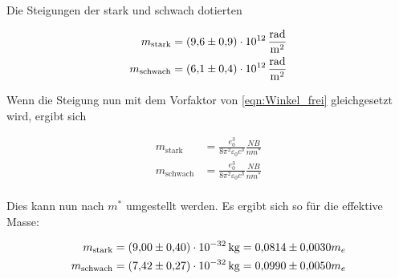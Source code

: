 \noindent Die Steigungen der stark und schwach dotierten  

\begin{align*}
    m_\text{stark}  &=\qty{9.6\pm0.9e12}{\radian \per \meter \squared}\\
    m_\text{schwach}&=\qty{6.1\pm0.4e12}{\radian \per \meter \squared}\\
\end{align*}

\noindent Wenn die Steigung nun mit dem Vorfaktor von \autoref{eqn:Winkel_frei} gleichgesetzt wird, ergibt sich

\begin{align*}
    m_\text{stark}  &=\frac{e_0^3}{8 \pi ^2 \varepsilon_0c^3} \frac{NB}{nm^*}\\
    m_\text{schwach}&=\frac{e_0^3}{8 \pi ^2 \varepsilon_0c^3} \frac{NB}{nm^*}\\
\end{align*}

\noindent Dies kann nun nach $m^*$ umgestellt werden. Es ergibt sich so für die effektive Masse:

\begin{align*}
    m_\text{stark}  &=\qty{9.00\pm0.40e-32}{\kilo \gram} = \num{0.0814\pm0.0030}m_e\\
    m_\text{schwach}&=\qty{7.42\pm0.27e-32}{\kilo \gram} = \num{0.0990\pm0.0050}m_e\\
\end{align*}






